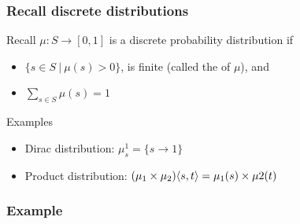 \documentclass[aspectratio=169]{beamer}
\begin{document}
\begin{frame}[t]\frametitle{Recall discrete distributions}

  \begin{block}{Recall}
  $\mu: S\to [0,1]$ is a \alert{discrete probability distribution} if
  \begin{itemize}
  \item $\{s \in S ~|~ \mu(s) >0\}$, is finite (called the  of $\mu$), and
  \item $\sum_{s\in S} \mu(s) = 1$
  \end{itemize}
  \end{block}

  \begin{exampleblock}{Examples}
  \begin{itemize}
        \item \alert{Dirac distribution}: $\mu^1_s = \{s \to 1\}$
        \item \alert{Product distribution}: $(\mu_1 \times\mu_2)\langle s,t \rangle = \mu_1(s) \times \mu 2(t)$
  \end{itemize}    
  \end{exampleblock}
\end{frame}


\begin{frame}[t]\frametitle{Example}
  \centering

\end{frame}
\end{document}

